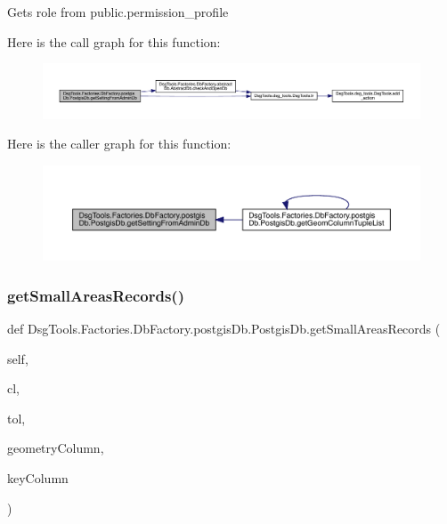 \begin{DoxyVerb}Gets role from public.permission_profile
\end{DoxyVerb}
 Here is the call graph for this function\+:
\nopagebreak
\begin{figure}[H]
\begin{center}
\leavevmode
\includegraphics[width=350pt]{class_dsg_tools_1_1_factories_1_1_db_factory_1_1postgis_db_1_1_postgis_db_aa1c8e310a041de3d41cab1aad19845e2_cgraph}
\end{center}
\end{figure}
Here is the caller graph for this function\+:
\nopagebreak
\begin{figure}[H]
\begin{center}
\leavevmode
\includegraphics[width=350pt]{class_dsg_tools_1_1_factories_1_1_db_factory_1_1postgis_db_1_1_postgis_db_aa1c8e310a041de3d41cab1aad19845e2_icgraph}
\end{center}
\end{figure}
\mbox{\label{class_dsg_tools_1_1_factories_1_1_db_factory_1_1postgis_db_1_1_postgis_db_aed401d01316e2d090c18bb9d184ddcc8}} 
\subsubsection{\texorpdfstring{get\+Small\+Areas\+Records()}{getSmallAreasRecords()}}
{\footnotesize\ttfamily def Dsg\+Tools.\+Factories.\+Db\+Factory.\+postgis\+Db.\+Postgis\+Db.\+get\+Small\+Areas\+Records (\begin{DoxyParamCaption}\item[{}]{self,  }\item[{}]{cl,  }\item[{}]{tol,  }\item[{}]{geometry\+Column,  }\item[{}]{key\+Column }\end{DoxyParamCaption})}

